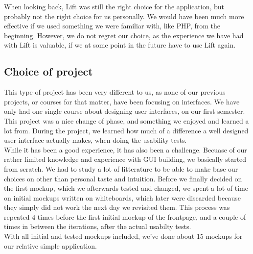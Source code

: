 When looking back, Lift was still the right choice for the application, but probably not the right choice for us personally. We would have been much more effective if we used something we were familiar with, like PHP, from the beginning. However, we do not regret our choice, as the experience we have had with Lift is valuable, if we at some point in the future have to use Lift again.

\subsection{Choice of project}
This type of project has been very different to us, as none of our previous projects, or courses for that matter, have been focusing on interfaces. We have only had one single course about designing user interfaces, on our first semester. \\
This project was a nice change of phase, and something we enjoyed and learned a lot from. During the project, we learned how much of a difference a well designed user interface actually makes, when doing the usability tests.\\
While it has been a good experience, it has also been a challenge. Becuase of our rather limited knowledge and experience with GUI building, we basically started from scratch. We had to study a lot of litterature to be able to make base our choices on other than personal taste and intuition. Before we finally decided on the first mockup, which we afterwards tested and changed, we spent a lot of time on initial mockups written on whiteboards, which later were discarded because they simply did not work the next day we revisited them. This process was repeated 4 times before the first initial mockup of the frontpage, and a couple of times in between the iterations, after the actual usabilty tests.\\ With all initial and tested mockups included, we've done about 15 mockups for our relative simple application.
